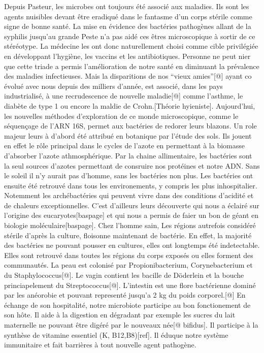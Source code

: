 \documentclass[12pt,a4paper]{article}
\begin{document}
Depuis Pasteur, les microbes ont toujours été associé aux maladies. Ils sont les agents nuisibles devant être eradiqué dans le fantasme d’un corps stérile comme signe de bonne santé.
La mise en évidence des bactéries pathogènes allant de la syphilis jusqu’au grande Peste n’a pas aidé ces êtres microscopique à sortir de ce stéréotype. La médecine les ont donc naturellement choisi comme cible privilégiée en développant l’hygiène, les vaccins et les antibiotiques.
Personne ne peut nier que cette triade a permis l’amélioration de notre santé en diminuant la prévalence des maladies infectieuses. Mais la disparitions de nos “vieux amies”[@] ayant co évolué avec nous depuis des milliers d’année, est associé, dans les pays industrialisé, à une recrudescence de nouvelle maladie[@] comme l’asthme, le diabète de type 1 ou encore la maldie de Crohn.[Théorie hyieniste].
Aujourd’hui, les nouvelles méthodes d’exploration de ce monde microscopique, comme le séquençage de l’ARN 16S, permet aux bactéries de redorer leurs blazons.
Un role majeur leurs à d’abord été attribué en botanique par l’étude des sols. Ils jouent en effet le rôle principal dans le cycles de l’azote en permettant à la biomasse d’absorber l’azote athmosphérique. Par la chaine allimentaire, les bactéries sont la seul sources d’azotes permettant de consruire nos protéines et notre ADN. Sans le soleil il n’y aurait pas d’homme, sans les bactéries non plus.
Les bactéries ont ensuite été retrouvé dans tous les environements, y compris les plus inhospitalier. Notemment les archébactéries qui peuvent vivre dans des conditions d’acidité et de chaleurs exceptionnelles. C’est d’ailleurs leurs découverte qui nous a éclairé sur l’origine des eucaryotes[baspage] et qui nous a permis de faier un bon de géant en biologie moléculaire[baspage].
Chez l’homme sain, Les régions autrefois considéré stérile d’après la culture, floisonne maintenant de bactérie. En effet, la majorité des bactéries ne pouvant pousser en cultures, elles ont longtemps été indetectable.
Elles sont retrouvé dans toutes les régions du corps exposés ou elles forment des communautés.
La peau est colonisé par Propionibacterium, Corynebacterium et du Staphylococcus[@]. Le vagin contient les bacille de Döderlein et la bouche princiapelement du Streptococcus[@].
L’intestin est une flore bactérienne dominé par les anéorobie et pouvant representé jusqu’a 2 kg du poids corporel.[@]
En échange de son hospitalité, notre microbiote participe au bon fonctionement de son hôte. Il aide à la digestion en dégradant par exemple les sucres du lait maternelle ne pouvant être digéré par le nouveaux née[@ bifidus]. Il participe à la synthèse de vitamine essentiel (K, B12,B8)[ref]. Il éduque notre système immunitaire et fait barrières à tout nouvelle agent pathogène.
\end{document}
